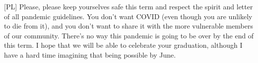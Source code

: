 \documentclass[letterpaper,10pt]{article}
\begin{document}
[PL] Please, please keep yourselves safe this term and respect the spirit and letter of all pandemic guidelines. You don't want COVID (even though you are unlikely to die from it), and you don't want to share it with the more vulnerable members of our community. There's no way this pandemic is going to be over by the end of this term. I hope that we will be able to celebrate your graduation, although I have a hard time imagining that being possible by June. 





\end{document}
